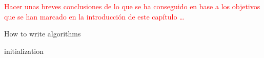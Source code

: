 \textcolor{red}{Hacer unas breves conclusiones de lo que se ha conseguido en base a los objetivos que se han marcado en la introducción de este capítulo \ldots}

\begin{algorithm}[H]
 \caption{How to write algorithms}
 \label{alg:howto}
 initialization\;
\end{algorithm}
